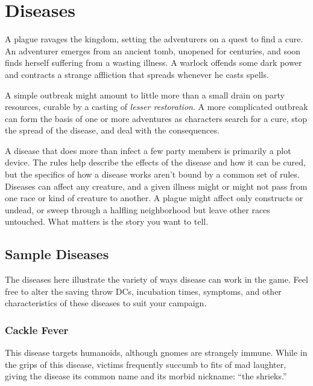 \documentclass[
]{article}
\date{}
\begin{document}
\hypertarget{diseases}{%
\section{Diseases}\label{diseases}}

A plague ravages the kingdom, setting the adventurers on a quest to find
a cure. An adventurer emerges from an ancient tomb, unopened for
centuries, and soon finds herself suffering from a wasting illness. A
warlock offends some dark power and contracts a strange affliction that
spreads whenever he casts spells.

A simple outbreak might amount to little more than a small drain on
party resources, curable by a casting of \emph{lesser restoration}. A
more complicated outbreak can form the basis of one or more adventures
as characters search for a cure, stop the spread of the disease, and
deal with the consequences.

A disease that does more than infect a few party members is primarily a
plot device. The rules help describe the effects of the disease and how
it can be cured, but the specifics of how a disease works aren't bound
by a common set of rules. Diseases can affect any creature, and a given
illness might or might not pass from one race or kind of creature to
another. A plague might affect only constructs or undead, or sweep
through a halfling neighborhood but leave other races untouched. What
matters is the story you want to tell.

\hypertarget{sample-diseases}{%
\subsection{Sample Diseases}\label{sample-diseases}}

The diseases here illustrate the variety of ways disease can work in the
game. Feel free to alter the saving throw DCs, incubation times,
symptoms, and other characteristics of these diseases to suit your
campaign.

\hypertarget{cackle-fever}{%
\subsubsection{Cackle Fever}\label{cackle-fever}}

This disease targets humanoids, although gnomes are strangely immune.
While in the grips of this disease, victims frequently succumb to fits
of mad laughter, giving the disease its common name and its morbid
nickname: ``the shrieks.''
\end{document}
